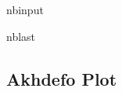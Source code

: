 \documentclass[letterpaper,10pt]{sphinxmanual}
\begin{document}
\begin{sphinxuseclass}{nbinput}
\begin{sphinxuseclass}{nblast}
{
\begin{sphinxVerbatim}[commandchars=\\\{\}]
\llap{\color{nbsphinxin}[ ]:\,\hspace{\fboxrule}\hspace{\fboxsep}}
\end{sphinxVerbatim}
}

\end{sphinxuseclass}
\end{sphinxuseclass}


\sphinxstepscope


\subsection{Akhdefo Plot}
\label{\detokenize{notebooks/Akhdefo_plot:Akhdefo-Plot}}\label{\detokenize{notebooks/Akhdefo_plot::doc}}
\sphinxAtStartPar
{}
\end{document}

